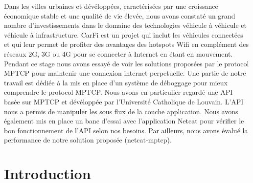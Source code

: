 \documentclass[a4paper,11pt]{article}
\begin{document}
		\begin{description}

			\item \hspace{2cm} Dans les villes urbaines et dévéloppées, caractérisées par une croissance économique stable et une qualité de vie élevée, nous avons constaté un grand nombre d'investissements dans le domaine des technologies véhicule à véhicule et véhicule à infrastructure. CarFi est un projet qui inclut les véhicules connectées et qui leur permet de profiter des avantages des hotspots Wifi en complément des réseaux 2G, 3G ou 4G pour se connecter à Internet en étant en mouvement. Pendant ce stage nous avons essayé de voir les solutions proposées par le protocol MPTCP pour maintenir une connexion internet perpetuelle. Une partie de notre travail est dédiée à la mis en place d'un système de déboggage pour mieux comprendre le protocol MPTCP. Nous avons en particulier regardé une API basée sur MPTCP et dévéloppée par l'Université Catholique de Louvain. L'API nous a permis de manipuler les sous flux de la couche application. Nous avons également mis en place un banc d'essai avec l'application Netcat pour vérifier le bon fonctionnement de l'API selon nos besoins. Par ailleurs, nous avons évalué la performance de notre solution proposée (netcat-mptcp).
			
		\end{description}
		
	

	\clearpage

	\setcounter{tocdepth}{3}

	\tableofcontents

	\clearpage

	
	\section{Introduction}

		\vspace{0.5cm}
\end{document}

